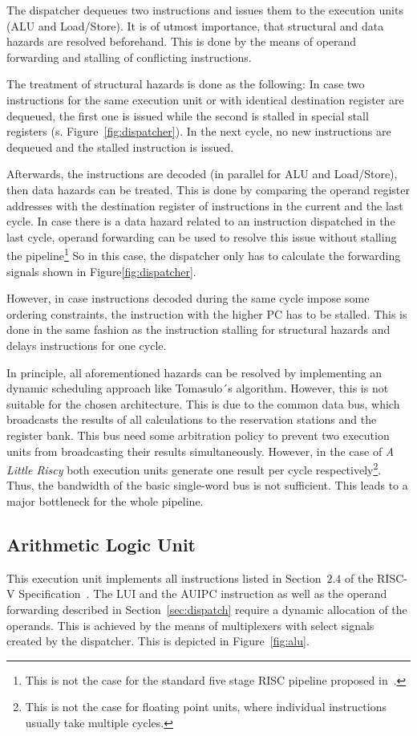 \documentclass[conference]{IEEEtran}
\begin{document}
The dispatcher dequeues two instructions and issues them to the execution units (ALU and Load/Store). It is of utmost importance, that structural and data hazards are resolved beforehand. This is done by the means of operand forwarding and stalling of conflicting instructions.

The treatment of structural hazards is done as the following: In case two instructions for the same execution unit or with identical destination register are dequeued, the first one is issued while the second is stalled in special stall registers (s. Figure~\ref{fig:dispatcher}). In the next cycle, no new instructions are dequeued and the stalled instruction is issued.

Afterwards, the instructions are decoded (in parallel for ALU and Load/Store), then data hazards can be treated. This is done by comparing the operand register addresses with the destination register of instructions in the current and the last cycle. In case there is a data hazard related to an instruction dispatched in the last cycle, operand forwarding can be used to resolve this issue without stalling the pipeline\footnote{This is not the case for the standard five stage RISC pipeline proposed in~\cite{HP}.} So in this case, the dispatcher only has to calculate the forwarding signals shown in Figure\ref{fig:dispatcher}.

However, in case instructions decoded during the same cycle impose some ordering constraints, the instruction with the higher PC has to be stalled. This is done in the same fashion as the instruction stalling for structural hazards and delays instructions for one cycle.

In principle, all aforementioned hazards can be resolved by implementing an dynamic scheduling approach like Tomasulo´s algorithm. However, this is not suitable for the chosen architecture. This is due to the common data bus, which broadcasts the results of all calculations to the reservation stations and the register bank. This bus need some arbitration policy to prevent two execution units from broadcasting their results simultaneously. However, in the case of \emph{A Little Riscy} both execution units generate one result per cycle respectively\footnote{This is not the case for floating point units, where individual instructions usually take multiple cycles.}. Thus, the bandwidth of the basic single-word bus is not sufficient. This leads to a major bottleneck for the whole pipeline.

\subsection{Arithmetic Logic Unit}
This execution unit implements all instructions listed in Section~$2.4$ of the RISC-V Specification~\cite{risc-v}. The LUI and the AUIPC instruction as well as the operand forwarding described in Section~\ref{sec:dispatch} require a dynamic allocation of the operands. This is achieved by the means of multiplexers with select signals created by the dispatcher. This is depicted in Figure~\ref{fig:alu}.
\end{document}
